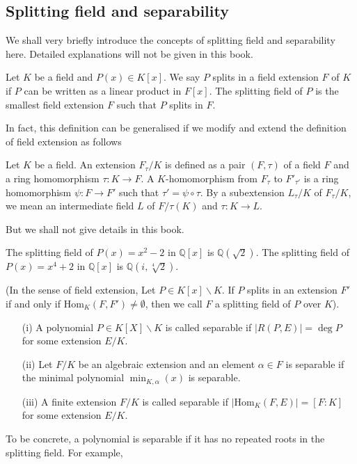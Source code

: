 \subsection{Splitting field and separability}
We shall very briefly introduce the concepts of splitting field and separability here. Detailed explanations will not be given in this book.
\begin{definition} Let $K$ be a field and $P(x) \in K[x]$. We say $P$ splits in a field extension $F$ of $K$ if $P$ can be written as a linear product in $F[x]$. The splitting field of $P$ is the smallest field extension $F$ such that $P$ splits in $F$.
\end{definition}
In fact, this definition can be generalised if we modify and extend the definition of field extension as follows
\begin{definition} Let $K$ be a field. An extension $F_\tau/K$ is defined as a pair $(F, \tau)$ of a
field $F$ and a ring homomorphism $\tau: K \rightarrow F$. A $K$-homomorphism from $F_\tau$ to $F'_{\tau'}$
is a ring homomorphism $\psi : F \rightarrow F'$ such that $\tau' = \psi \circ \tau$. By a subextension
$L_\tau/K$ of $F_\tau/K$, we mean an intermediate field $L$ of $F/\tau(K)$ and $\tau : K \rightarrow L$.
\end{definition}
But we shall not give details in this book.
\begin{example} The splitting field of $P(x)=x^2-2$ in $\mathbb{Q}[x]$ is $\mathbb{Q}(\sqrt{2})$. The splitting field of
$P(x)=x^4+2$ in $\mathbb{Q}[x]$ is $\mathbb{Q}(i,\sqrt[4]{2})$.
\end{example}
(In the sense of field extension, Let $P \in K[x]\backslash K$. If $P$ splits in an extension $F'$ if and only if
Hom$_K(F,F')\neq \emptyset$, then we call $F$ a splitting field of $P$ over $K$).
\begin{definition}
\begin{enumerate}
\item[(i)] A polynomial $P \in K[X]\backslash K$ is called separable if $|R(P,E)| =
\deg{P}$ for some extension $E/K$.
\item[(ii)] Let $F/K$ be an algebraic extension and an element $\alpha \in F$ is separable if the minimal polynomial
$\min_{K,\alpha}(x)$ is separable.
\item[(iii)] A finite extension $F/K$ is called separable if $|\text{Hom}_K(F,E)| = [F : K]$ for some
extension $E/K$.
\end{enumerate}
\end{definition}
To be concrete, a polynomial is separable if it has no repeated roots in the splitting field. For example,
